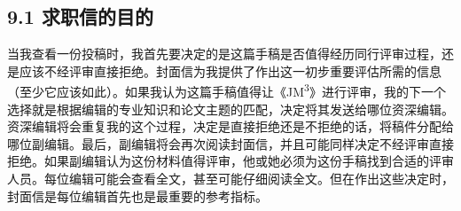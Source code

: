 \subsection*{9.1 求职信的目的}
当我查看一份投稿时，我首先要决定的是这篇手稿是否值得经历同行评审过程，还是应该不经评审直接拒绝。封面信为我提供了作出这一初步重要评估所需的信息（至少它应该如此）。如果我认为这篇手稿值得让《JM\textsuperscript{3}》进行评审，我的下一个选择就是根据编辑的专业知识和论文主题的匹配，决定将其发送给哪位资深编辑。资深编辑将会重复我的这个过程，决定是直接拒绝还是不拒绝的话，将稿件分配给哪位副编辑。最后，副编辑将会再次阅读封面信，并且可能同样决定不经评审直接拒绝。如果副编辑认为这份材料值得评审，他或她必须为这份手稿找到合适的评审人员。每位编辑可能会查看全文，甚至可能仔细阅读全文。但在作出这些决定时，封面信是每位编辑首先也是最重要的参考指标。


